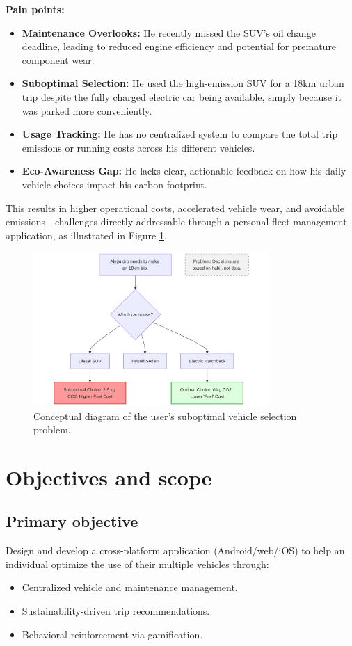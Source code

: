 \textbf{Pain points:}
\begin{itemize}
    \item \textbf{Maintenance Overlooks:} He recently missed the SUV's oil change deadline, leading to reduced engine efficiency and potential for premature component wear.
    \item \textbf{Suboptimal Selection:} He used the high-emission SUV for a 18km urban trip despite the fully charged electric car being available, simply because it was parked more conveniently.
    \item \textbf{Usage Tracking:} He has no centralized system to compare the total trip emissions or running costs across his different vehicles.
    \item \textbf{Eco-Awareness Gap:} He lacks clear, actionable feedback on how his daily vehicle choices impact his carbon footprint.
\end{itemize}

This results in higher operational costs, accelerated vehicle wear, and avoidable emissions—challenges directly addressable through a personal fleet management application, as illustrated in Figure \ref{fig:user-problem-diagram}.

\begin{figure}[h!]
    \centering
    \includegraphics[width=0.8\textwidth]{images/user-problem-diagram.png}
    \caption{Conceptual diagram of the user's suboptimal vehicle selection problem.}
    \label{fig:user-problem-diagram}
\end{figure}


\section{Objectives and scope}

\subsection{Primary objective}
Design and develop a cross-platform application (Android/web/iOS) to help an individual optimize the use of their multiple vehicles through:
\begin{itemize}
    \item Centralized vehicle and maintenance management.
    \item Sustainability-driven trip recommendations.
    \item Behavioral reinforcement via gamification.
\end{itemize}

